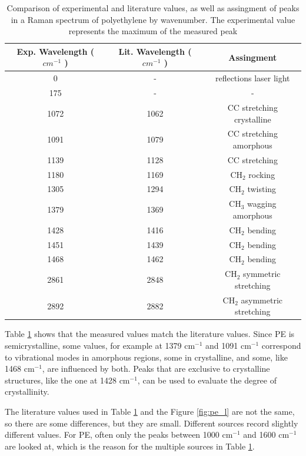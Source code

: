     \begin{table}[h]
    \begin{center}
        \vspace{15pt}
        \begin{tabular}{|c|c|c|}
         \hline
         Exp. Wavelength (\( cm^{-1} \) ) & Lit. Wavelength  (\( cm^{-1} \) ) & Assingment  \\ 
         \hline
         0 & - & reflections laser light \\
         175 & - & - \\
         1072 & 1062 & CC stretching crystalline\\ 
         1091 & 1079 & CC stretching amorphous\\
         1139 & 1128 & CC stretching\\
         1180 & 1169 & CH\(_2\) rocking\\
         1305 & 1294 & CH\(_2\) twisting\\
         1379 & 1369 & CH\(_3\) wagging amorphous\\
         1428 & 1416 & CH\(_2\) bending \\
         1451 & 1439 & CH\(_2\) bending\\
         1468 & 1462 & CH\(_2\) bending\\
         2861& 2848 &  CH\(_2\) symmetric stretching\\
         2892& 2882 &  CH\(_2\) asymmetric stretching\\
         \hline
        \end{tabular}
        \caption{Comparison of experimental and literature \cite{pel1} \cite{pel2} values, as well as assingment of peaks in a Raman spectrum of polyethylene by wavenumber. The experimental value represents the maximum of the measured peak }
        \label{table:pe}
    \end{center}
    \end{table}

    Table \ref{table:pe} shows that the measured values match the literature values. Since PE is semicrystalline, some values, for example at 1379 cm\(^{-1}\) and 1091 cm\(^{-1}\) correspond to vibrational modes in amorphous regions, some in crystalline, and some, like 1468 cm\(^{-1}\), are influenced by both. Peaks that are exclusive to crystalline structures, like the one at 1428 cm\(^{-1}\), can be used to evaluate the degree of crystallinity.

    \bigskip
    
    The literature values used in Table \ref{table:pe} and the Figure \ref{fig:pe_l} are not the same, so there are some differences, but they are small. Different sources record slightly different values. For PE, often only the peaks between 1000 cm\(^{-1}\) and 1600 cm\(^{-1}\) are looked at, which is the reason for the multiple sources in Table \ref{table:pe}.

